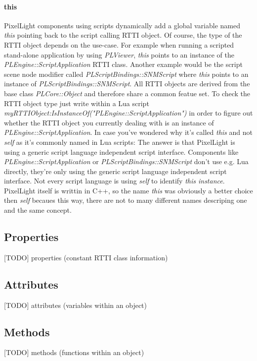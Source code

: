 \paragraph{this}
PixelLight components using scripts dynamically add a global variable named \emph{this} pointing back to the script calling RTTI object. Of course, the type of the RTTI object depends on the use-case. For example when running a scripted stand-alone application by using \emph{PLViewer}, \emph{this} points to an instance of the \emph{PLEngine::ScriptApplication} RTTI class. Another example would be the script scene node modifier called \emph{PLScriptBindings::SNMScript} where \emph{this} points to an instance of \emph{PLScriptBindings::SNMScript}. All RTTI objects are derived from the base class \emph{PLCore::Object} and therefore share a common featue set. To check the RTTI object type just write within a Lua script \emph{myRTTIObject:IsInstanceOf("PLEngine::ScriptApplication")} in order to figure out whether the RTTI object you currently dealing with is an instance of \emph{PLEngine::ScriptApplication}. In case you've wondered why it's called \emph{this} and not \emph{self} as it's commonly named in Lua scripts: The answer is that PixelLight is using a generic script language independent script interface. Components like \emph{PLEngine::ScriptApplication} or \emph{PLScriptBindings::SNMScript} don't use e.g. Lua directly, they're only using the generic script language independent script interface. Not every script language is using \emph{self} to identify \emph{this instance}. PixelLight itself is writtin in C++, so the name \emph{this} was obviously a better choice then \emph{self} becaues this way, there are not to many different names descriping one and the same concept.


\subsection{Properties}
[TODO]
properties (constant RTTI class information)


\subsection{Attributes}
[TODO]
attributes (variables within an object)


\subsection{Methods}
[TODO]
methods (functions within an object)


